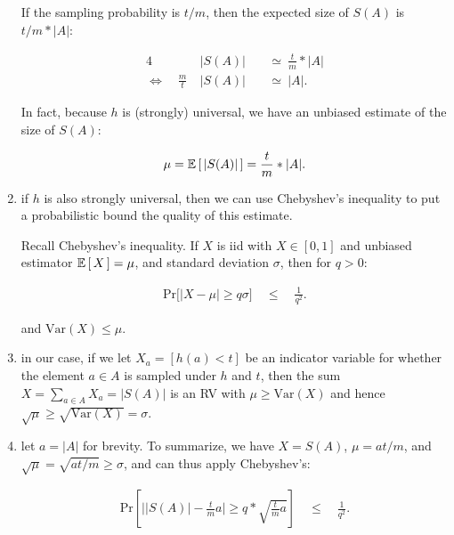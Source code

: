 \begin{enumerate}
        If the sampling probability is $t/m$, then the expected size of $S(A)$
        is $t/m * |A|$:

        \begin{textred}
        \begin{alignat*}{4}
                                             & |S(A)| \ &&\simeq \ \frac{t}{m} * |A|\\
          \Leftrightarrow \quad \frac{m}{t}\ & |S(A)| \ &&\simeq \ |A|.
        \end{alignat*}
        \end{textred}

        In fact, because $h$ is (strongly) universal, we have an unbiased
        estimate of the size of $S(A)$:

        \begin{textred}
        \begin{align}
          \mu = \mathbb E\left[\, |S(A)|\, \right] = \frac{t}{m} * |A|.
        \end{align}
        \end{textred}

      \item if $h$ is also strongly universal, then we can use Chebyshev's
        inequality to put a probabilistic bound the quality of this estimate.

        Recall Chebyshev's inequality. If $X$ is iid with $X \in [0, 1]$ and
        unbiased estimator $\mathbb E\left[\, X\, \right] = \mu$, and standard deviation $\sigma$, then
        for $q > 0$:

        \begin{textred}
          \begin{align}
            \text{Pr}\big[|X - \mu | \geq q \sigma\big] \quad \leq \quad \frac{1}{q^2}.
          \end{align}
        \end{textred}

        and $\text{Var}(X) \leq \mu$.

      \item in our case, if we let $X_a = [h(a) < t]$ be an indicator variable
        for whether the element $a \in A$ is sampled under $h$ and $t$, then the
        sum $X = \sum_{a \in A} X_a = |S(A)|$ is an RV with $\mu \geq
        \text{Var}(X)$ and hence $\sqrt{\mu} \geq \sqrt{\text{Var}(X)} =
        \sigma$.

      \item let $a = |A|$ for brevity. To summarize, we have $X = S(A)$, $\mu =
        at/m$, and $\sqrt{\mu} = \sqrt{at/m} \geq \sigma$, and can thus apply Chebyshev's:

        \begin{textred}
          \begin{align}
            \text{Pr}\left[\Big\vert|S(A)| - \frac{t}{m} a
            \Big\vert \geq q * \sqrt{\frac{t}{m}a}\right] \quad \leq \quad
            \frac{1}{q^2}.
          \end{align}
        \end{textred}

\end{enumerate}
